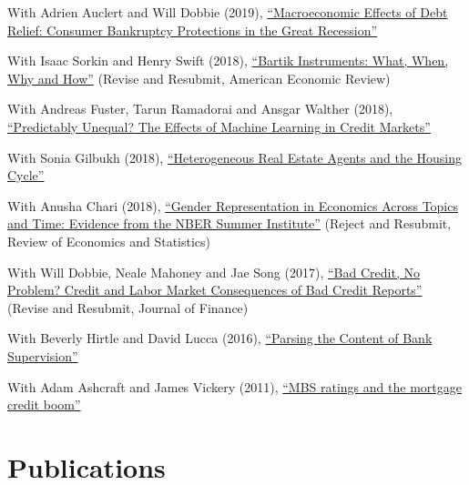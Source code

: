 \documentclass[letterpaper]{article}
\renewenvironment{itemize}{
  \begin{list}{}
    { \setlength{\itemsep}{5pt}
      \setlength{\parsep}{0pt}
      \setlength{\topsep}{0pt}
      \setlength{\leftmargin}{0em} } }{
  \end{list}}
\begin{document}
\begin{itemize}
\item With Adrien Auclert and Will Dobbie (2019), \href{http://paulgp.github.io/papers/Macroeconomic_Effects_of_Debt_Relief_Posting_342019.pdf}{``Macroeconomic Effects of Debt Relief: Consumer Bankruptcy Protections in the Great Recession''}
\item With Isaac Sorkin and Henry Swift (2018), \href{http://paulgp.github.io/papers/bartik_gpss.pdf}{``Bartik Instruments: What, When, Why and How''} (Revise and Resubmit, American Economic Review)
\item With Andreas Fuster, Tarun Ramadorai and Ansgar Walther (2018), \href{http://paulgp.github.io/papers/MLCreditPaper.pdf}{``Predictably Unequal? The Effects of Machine Learning in Credit Markets''}
\item With Sonia Gilbukh (2018), \href{http://paulgp.github.io/papers/Agents_v1.pdf}{``Heterogeneous Real Estate Agents and the Housing Cycle''}
\item With Anusha Chari (2018), \href{http://paulgp.github.io/papers/cgp_nbergender.pdf}{``Gender Representation in Economics Across Topics and Time: Evidence from the NBER Summer Institute''} (Reject and Resubmit, Review of Economics and Statistics)
\item With Will Dobbie, Neale Mahoney and Jae Song (2017), \href{https://papers.ssrn.com/sol3/papers.cfm?abstract_id=2844316}{``Bad Credit, No Problem? Credit and Labor Market Consequences of Bad Credit Reports''} (Revise and Resubmit, Journal of Finance)
\item With Beverly Hirtle and David Lucca (2016), \href{https://www.newyorkfed.org/research/staff_reports/sr770.html}{``Parsing the Content of Bank Supervision''}
\item With Adam Ashcraft and James Vickery (2011), \href{http://papers.ssrn.com/sol3/papers.cfm?abstract_id=1615613}{``MBS ratings and the mortgage credit boom''}
\end{itemize}

\section*{Publications}
\end{document}
